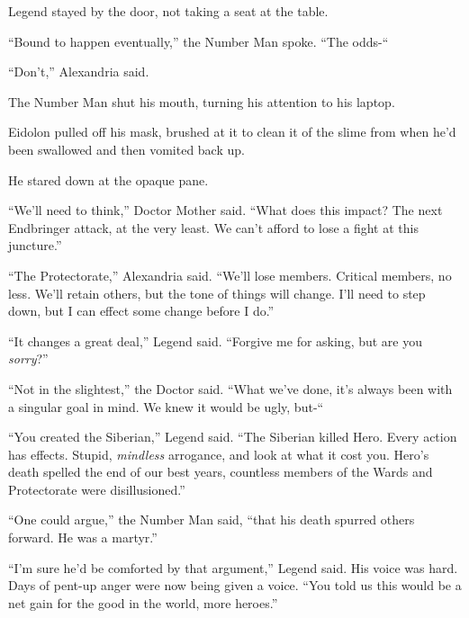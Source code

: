 Legend stayed by the door, not taking a seat at the table.



``Bound to happen eventually,'' the Number Man spoke.  ``The odds-``



``Don't,'' Alexandria said.



The Number Man shut his mouth, turning his attention to his laptop.



Eidolon pulled off his mask, brushed at it to clean it of the slime from when he'd been swallowed and then vomited back up.



He stared down at the opaque pane.



``We'll need to think,'' Doctor Mother said.  ``What does this impact?  The next Endbringer attack, at the very least.  We can't afford to lose a fight at this juncture.''



``The Protectorate,'' Alexandria said.  ``We'll lose members.  Critical members, no less.  We'll retain others, but the tone of things will change.  I'll need to step down, but I can effect some change before I do.''



``It changes a great deal,'' Legend said.  ``Forgive me for asking, but are you \emph{sorry}?''



``Not in the slightest,'' the Doctor said.  ``What we've done, it's always been with a singular goal in mind.  We knew it would be ugly, but-``



``You created the Siberian,'' Legend said.  ``The Siberian killed Hero.  Every action has effects.  Stupid, \emph{mindless} arrogance, and look at what it cost you.  Hero's death spelled the end of our best years, countless members of the Wards and Protectorate were disillusioned.''



``One could argue,'' the Number Man said, ``that his death spurred others forward.  He was a martyr.''



``I'm sure he'd be comforted by that argument,'' Legend said.  His voice was hard.  Days of pent-up anger were now being given a voice.  ``You told us this would be a net gain for the good in the world, more heroes.''



